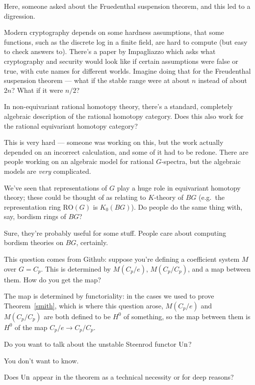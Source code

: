 Here, someone asked about the Fruedenthal suspension theorem, and this led to a digression.
\begin{rem}
Modern cryptography depends on some hardness assumptions, that some functions, such as the discrete log in a finite
field, are hard to compute (but easy to check answers to). There's a paper by Impagliazzo which asks what
cryptography and security would look like if certain assumptions were false or true, with cute names for different
worlds. Imagine doing that for the Freudenthal suspension theorem --- what if the stable range were at about $n$
instead of about $2n$? What if it were $n/2$?
\end{rem}
\begin{ques}
In non-equivariant rational homotopy theory, there's a standard, completely algebraic description of the rational
homotopy category. Does this also work for the rational equivariant homotopy category?
\end{ques}
This is very hard --- someone was working on this, but the work actually depended on an incorrect calculation, and
some of it had to be redone. There are people working on an algebraic model for rational $G$-spectra, but the
algebraic models are \emph{very} complicated.
\begin{ques}
We've seen that representations of $G$ play a huge role in equivariant homotopy theory; these could be thought of
as relating to $K$-theory of $BG$ (e.g.\ the representation ring $\mathrm{RO}(G)$ is $K_0(BG)$). Do people do the
same thing with, say, bordism rings of $BG$? %
\end{ques}
Sure, they're probably useful for some stuff. People care about computing bordism theories on $BG$, certainly.
\begin{ques}
This question comes from Github: suppose you're defining a coefficient system $M$ over $G = C_p$. This is
determined by $M(C_p/e)$, $M(C_p/C_p)$, and a map between them. How do you get the map?
\end{ques}
The map is determined by functoriality: in the cases we used to prove Theorem~\ref{smith}, which is where this
question arose, $M(C_p/e)$ and $M(C_p/C_p)$ are both defined to be $H^0$ of something, so the map between them is
$H^0$ of the map $C_p/e\to C_p/C_p$.
\begin{ques}
Do you want to talk about the unstable Steenrod functor $\operatorname{Un}$?
\end{ques}
You don't want to know.
\begin{ques}
Does $\operatorname{Un}$ appear in the theorem as a technical necessity or for deep reasons?
\end{ques}
